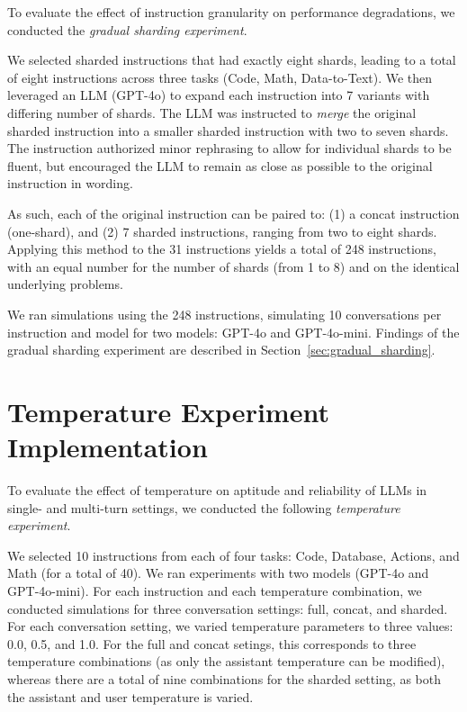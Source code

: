 \documentclass{article}
\begin{document}
\begin{appendices}
To evaluate the effect of instruction granularity on performance degradations, we conducted the \textit{gradual sharding experiment}.

We selected sharded instructions that had exactly eight shards, leading to a total of eight instructions across three tasks (Code, Math, Data-to-Text). We then leveraged an LLM (GPT-4o) to expand each instruction into 7 variants with differing number of shards. The LLM was instructed to \textit{merge} the original sharded instruction into a smaller sharded instruction with two to seven shards. The instruction authorized minor rephrasing to allow for individual shards to be fluent, but encouraged the LLM to remain as close as possible to the original instruction in wording.

As such, each of the original instruction can be paired to: (1) a concat instruction (one-shard), and (2) 7 sharded instructions, ranging from two to eight shards. Applying this method to the 31 instructions yields a total of 248 instructions, with an equal number for the number of shards (from 1 to 8) and on the identical underlying problems.

We ran simulations using the 248 instructions, simulating 10 conversations per instruction and model for two models: GPT-4o and GPT-4o-mini. Findings of the gradual sharding experiment are described in Section~\ref{sec:gradual_sharding}.

\section{Temperature Experiment Implementation} \label{app:temperature}

To evaluate the effect of temperature on aptitude and reliability of LLMs in single- and multi-turn settings, we conducted the following \textit{temperature experiment}.

We selected 10 instructions from each of four tasks: Code, Database, Actions, and Math (for a total of 40). We ran experiments with two models (GPT-4o and GPT-4o-mini). For each instruction and each temperature combination, we conducted simulations for three conversation settings: full, concat, and sharded. For each conversation setting, we varied temperature parameters to three values: 0.0, 0.5, and 1.0. For the full and concat setings, this corresponds to three temperature combinations (as only the assistant temperature can be modified), whereas there are a total of nine combinations for the sharded setting, as both the assistant and user temperature is varied.


\end{appendices}
\end{document}
